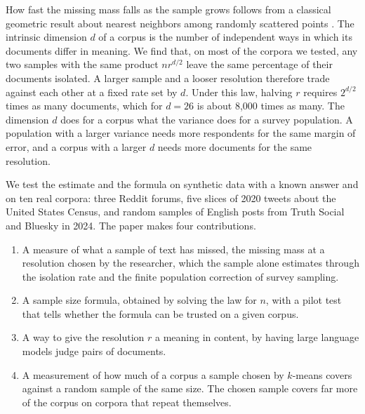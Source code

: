 How fast the missing mass falls as the sample grows follows from a classical geometric result about nearest neighbors among randomly scattered points \citep{penrose2003rgg,levina2005}. The intrinsic dimension $d$ of a corpus is the number of independent ways in which its documents differ in meaning. We find that, on most of the corpora we tested, any two samples with the same product $n r^{d/2}$ leave the same percentage of their documents isolated. A larger sample and a looser resolution therefore trade against each other at a fixed rate set by $d$. Under this law, halving $r$ requires $2^{d/2}$ times as many documents, which for $d = 26$ is about 8{,}000 times as many. The dimension $d$ does for a corpus what the variance does for a survey population. A population with a larger variance needs more respondents for the same margin of error, and a corpus with a larger $d$ needs more documents for the same resolution.

We test the estimate and the formula on synthetic data with a known answer and on ten real corpora: three Reddit forums, five slices of 2020 tweets about the United States Census, and random samples of English posts from Truth Social and Bluesky in 2024. The paper makes four contributions.
\begin{enumerate}
\item A measure of what a sample of text has missed, the missing mass at a resolution chosen by the researcher, which the sample alone estimates through the isolation rate and the finite population correction of survey sampling.
\item A sample size formula, obtained by solving the law for $n$, with a pilot test that tells whether the formula can be trusted on a given corpus.
\item A way to give the resolution $r$ a meaning in content, by having large language models judge pairs of documents.
\item A measurement of how much of a corpus a sample chosen by $k$-means covers against a random sample of the same size. The chosen sample covers far more of the corpus on corpora that repeat themselves.
\end{enumerate}
